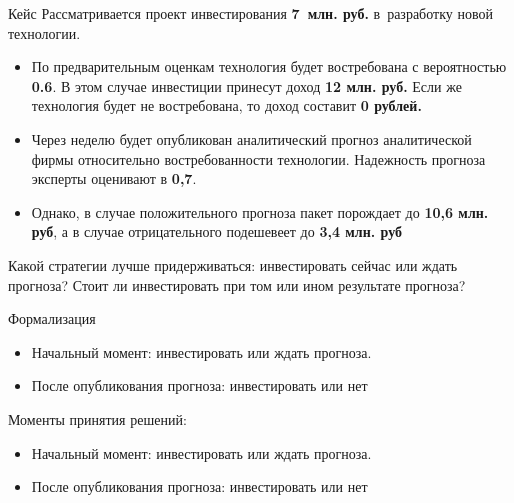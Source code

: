 \documentclass[unicode,11pt,notheorems]{beamer}
\begin{document}
\begin{frame}{Кейс}
	Рассматривается проект инвестирования \textbf{7~млн. руб.} в~разработку новой технологии.
	\begin{itemize}
	\item 
		По предварительным оценкам технология будет востребована с вероятностью \textbf{0.6}. 
		В этом случае инвестиции принесут доход \textbf{12 млн. руб.}
		Если же технология будет не востребована, то доход составит \textbf{0 рублей.}

	\item 
		Через неделю будет опубликован аналитический прогноз аналитической фирмы относительно востребованности технологии.
		Надежность прогноза эксперты оценивают в \textbf{0,7}.
	\item 
		Однако, в случае положительного прогноза пакет порождает до \textbf{10,6 млн. руб}, а в случае отрицательного подешевеет до \textbf{3,4 млн. руб}
\end{itemize}
\alert{Какой стратегии лучше придерживаться: инвестировать сейчас или ждать прогноза?
Стоит ли инвестировать при том или ином результате прогноза? }
\end{frame}

\begin{frame}{Формализация}
	\begin{itemize}
	\item 
		Начальный момент: инвестировать или ждать прогноза.
	\item 
		После опубликования прогноза: инвестировать или нет
	\end{itemize}

	Моменты принятия решений:
	\begin{itemize}
	\item 
		Начальный момент: инвестировать или ждать прогноза.
	\item 
		После опубликования прогноза: инвестировать или нет
	\end{itemize}

\end{frame}
\end{document}
